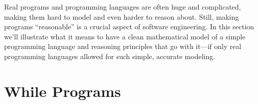 \label{while_chap}

\iffalse
\def\movesto{\mathrel{\longrightarrow}}
\newcommand{\while}{\text{\textbf{while}}}
\newcommand{\docomm}{\text{\textbf{do}}}
\newcommand{\odcomm}{\text{\textbf{od}}}
\newcommand{\wloop}[2]{\while\ #1\ \docomm\ #2\ \odcomm}
\newcommand{\assigned}{\mathbin{\mathtt{:=}}}
\newcommand{\condif}{\text{\textbf{if}}}
\newcommand{\condthen}{\text{\textbf{then}}}
\newcommand{\condelse}{\text{\textbf{else}}}
\newcommand{\condcomm}[3]{\condif\ #1\ \condthen\ #2\ \condelse\ #3}
\newcommand{\seqcomm}[2]{#1\mathbf{;}#2}
\newcommand{\Env}{\text{Env}}
\newcommand{\halt}{\text{\textbf{Done}}}
\newcommand{\state}[2]{\ang{#1,\, #2}}
\newcommand{\step}[4]{\state{#1}{#2} \movesto \state{#3}{#4}}
\newcommand{\haltswith}[3]{\state{#1}{#2}\movesto^* \state{\halt}{#3}}
\newcommand{\after}[3]{#1 \: \set{#2}\: #3}
\fi

Real programs and programming languages are often huge and complicated,
making them hard to model and even harder to reason about.  Still, making
programs ``reasonable'' is a crucial aspect of software engineering.  In
this section we'll illustrate what it means to have a clean mathematical
model of a simple programming language and reasoning principles that go
with it---if only real programming languages allowed for such simple,
accurate modeling.

\section{\textbf{While} Programs}

